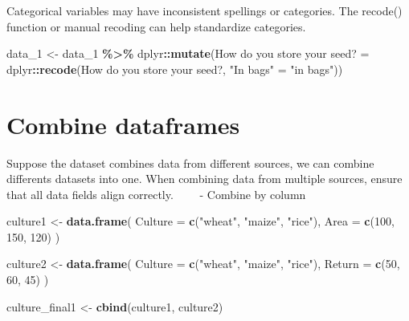 \documentclass[
]{book}
\newenvironment{Shaded}{\begin{snugshade}}{\end{snugshade}}
\newcommand{\AttributeTok}[1]{\textcolor[rgb]{0.13,0.29,0.53}{#1}}
\newcommand{\DecValTok}[1]{\textcolor[rgb]{0.00,0.00,0.81}{#1}}
\newcommand{\FunctionTok}[1]{\textcolor[rgb]{0.13,0.29,0.53}{\textbf{#1}}}
\newcommand{\NormalTok}[1]{#1}
\newcommand{\OtherTok}[1]{\textcolor[rgb]{0.56,0.35,0.01}{#1}}
\newcommand{\SpecialCharTok}[1]{\textcolor[rgb]{0.81,0.36,0.00}{\textbf{#1}}}
\newcommand{\StringTok}[1]{\textcolor[rgb]{0.31,0.60,0.02}{#1}}
\begin{document}
Categorical variables may have inconsistent spellings or categories. The recode() function or manual recoding can help standardize categories.

\begin{Shaded}
\begin{Highlighting}[]
\NormalTok{data\_1 }\OtherTok{\textless{}{-}}\NormalTok{ data\_1 }\SpecialCharTok{\%\textgreater{}\%}
\NormalTok{  dplyr}\SpecialCharTok{::}\FunctionTok{mutate}\NormalTok{(}\StringTok{\textasciigrave{}}\AttributeTok{How do you store your seed?}\StringTok{\textasciigrave{}} \OtherTok{=}\NormalTok{ dplyr}\SpecialCharTok{::}\FunctionTok{recode}\NormalTok{(}\StringTok{\textasciigrave{}}\AttributeTok{How do you store your seed?}\StringTok{\textasciigrave{}}\NormalTok{, }\StringTok{"In bags"} \OtherTok{=} \StringTok{"in bags"}\NormalTok{))}
\end{Highlighting}
\end{Shaded}

\hypertarget{combine-dataframes}{%
\section{Combine dataframes}\label{combine-dataframes}}

Suppose the dataset combines data from different sources, we can combine differents datasets into one. When combining data from multiple sources, ensure that all data fields align correctly.
~~~~- Combine by column

\begin{Shaded}
\begin{Highlighting}[]
\NormalTok{culture1 }\OtherTok{\textless{}{-}} \FunctionTok{data.frame}\NormalTok{(}
  \AttributeTok{Culture =} \FunctionTok{c}\NormalTok{(}\StringTok{"wheat"}\NormalTok{, }\StringTok{"maize"}\NormalTok{, }\StringTok{"rice"}\NormalTok{),}
  \AttributeTok{Area =} \FunctionTok{c}\NormalTok{(}\DecValTok{100}\NormalTok{, }\DecValTok{150}\NormalTok{, }\DecValTok{120}\NormalTok{)}
\NormalTok{)}

\NormalTok{culture2 }\OtherTok{\textless{}{-}} \FunctionTok{data.frame}\NormalTok{(}
  \AttributeTok{Culture =} \FunctionTok{c}\NormalTok{(}\StringTok{"wheat"}\NormalTok{, }\StringTok{"maize"}\NormalTok{, }\StringTok{"rice"}\NormalTok{),}
  \AttributeTok{Return =} \FunctionTok{c}\NormalTok{(}\DecValTok{50}\NormalTok{, }\DecValTok{60}\NormalTok{, }\DecValTok{45}\NormalTok{)}
\NormalTok{)}

\NormalTok{culture\_final1 }\OtherTok{\textless{}{-}} \FunctionTok{cbind}\NormalTok{(culture1, culture2)}
\end{Highlighting}
\end{Shaded}
\end{document}
